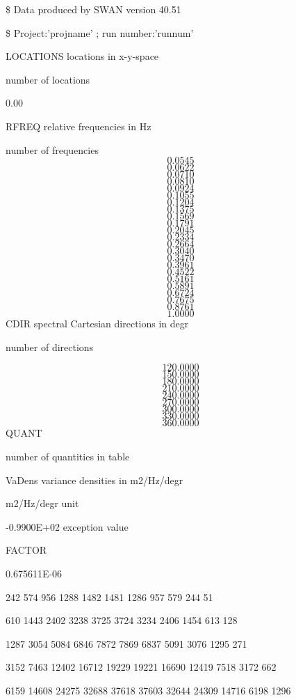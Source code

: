 \documentclass{article}
\begin{document}
\noindent \$ Data produced by SWAN version 40.51

\noindent \$ Project:'projname'     ;   run number:'runnum'

\noindent LOCATIONS                               locations in x-y-space

                                       number of locations

        0.00

\noindent RFREQ                                   relative frequencies in Hz

                                      number of frequencies
\[0.0545\] 
\[0.0622\] 
\[0.0710\] 
\[0.0810\] 
\[0.0924\] 
\[0.1055\] 
\[0.1204\] 
\[0.1375\] 
\[0.1569\] 
\[0.1791\] 
\[0.2045\] 
\[0.2334\] 
\[0.2664\] 
\[0.3040\] 
\[0.3470\] 
\[0.3961\] 
\[0.4522\] 
\[0.5161\] 
\[0.5891\] 
\[0.6724\] 
\[0.7675\] 
\[0.8761\] 
\[1.0000\] 
CDIR                                    spectral Cartesian directions in degr

                                    number of directions



\[120.0000\] 
\[150.0000\] 
\[180.0000\] 
\[210.0000\] 
\[240.0000\] 
\[270.0000\] 
\[300.0000\] 
\[330.0000\] 
\[360.0000\] 
QUANT

                                       number of quantities in table

\noindent VaDens                                  variance densities in m2/Hz/degr

\noindent m2/Hz/degr                              unit

\noindent -0.9900E+02                             exception value

\noindent FACTOR

\noindent 0.675611E-06

   242   574   956   1288  1482  1481   1286   957    579    244    51

  610   1443  2402  3238  3725  3724   3234   2406   1454   613    128

  1287  3054  5084  6846  7872  7869   6837   5091   3076   1295   271

  3152  7463  12402 16712 19229 19221  16690  12419  7518   3172   662

 6159  14608 24275 32688 37618 37603  32644  24309  14716  6198   1296
\end{document}
